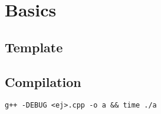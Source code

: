 \newpage
\section{Basics}

\subsection{Template}


\subsection{Compilation}
\begin{lstlisting}
g++ -DEBUG <ej>.cpp -o a && time ./a
\end{lstlisting}
\newpage
